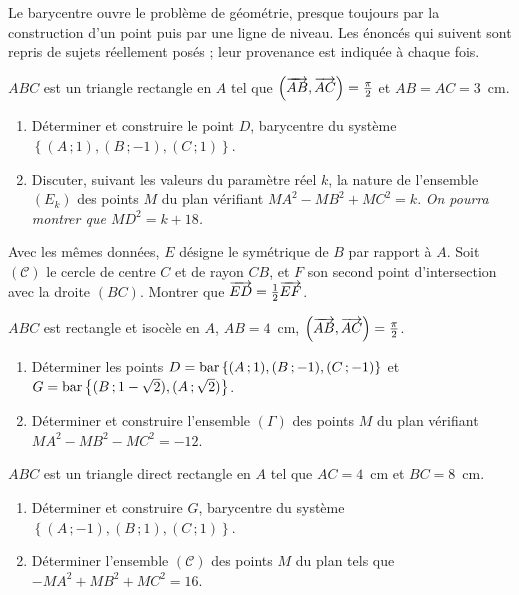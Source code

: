 \begin{annales}
Le barycentre ouvre le problème de géométrie, presque toujours par la
construction d'un point puis par une ligne de niveau. Les énoncés qui suivent
sont repris de sujets réellement posés ; leur provenance est indiquée à chaque
fois.

$ABC$ est un triangle rectangle en $A$ tel que
$\left(\overrightarrow{AB},\overrightarrow{AC}\right) = \frac{\pi}{2}$ et $AB = AC = 3$~cm.
\begin{enumerate}[label=\textbf{\alph*)}, leftmargin=*, itemsep=0.15em]
  \item Déterminer et construire le point $D$, barycentre du système
        $\left\{(A\,;1),(B\,;-1),(C\,;1)\right\}$.
  \item Discuter, suivant les valeurs du paramètre réel $k$, la nature de
        l'ensemble $(E_{k})$ des points $M$ du plan vérifiant
        $MA^{2}-MB^{2}+MC^{2} = k$. \emph{On pourra montrer que
        $MD^{2} = k+18$.}
\end{enumerate}

Avec les mêmes données, $E$ désigne le symétrique de $B$ par rapport à $A$.
Soit $(\mathcal C)$ le cercle de centre $C$ et de rayon $CB$, et $F$ son
second point d'intersection avec la droite $(BC)$. Montrer que
$\overrightarrow{ED} = \frac12\overrightarrow{EF}$.

$ABC$ est rectangle et isocèle en $A$, $AB = 4$~cm,
$\left(\overrightarrow{AB},\overrightarrow{AC}\right) = \frac{\pi}{2}$.
\begin{enumerate}[label=\textbf{\alph*)}, leftmargin=*, itemsep=0.15em]
  \item Déterminer les points
        $D = \operatorname{bar}\left\{(A\,;1),(B\,;-1),(C\,;-1)\right\}$ et
        $G = \operatorname{bar}\left\{(B\,;1-\sqrt2),(A\,;\sqrt2)\right\}$.
  \item Déterminer et construire l'ensemble $(\Gamma)$ des points $M$ du plan
        vérifiant $MA^{2}-MB^{2}-MC^{2} = -12$.
\end{enumerate}

$ABC$ est un triangle direct rectangle en $A$ tel que $AC = 4$~cm et
$BC = 8$~cm.
\begin{enumerate}[label=\textbf{\alph*)}, leftmargin=*, itemsep=0.15em]
  \item Déterminer et construire $G$, barycentre du système
        $\left\{(A\,;-1),(B\,;1),(C\,;1)\right\}$.
  \item Déterminer l'ensemble $(\mathcal C)$ des points $M$ du plan tels que
        $-MA^{2}+MB^{2}+MC^{2} = 16$.
\end{enumerate}


\end{annales}
